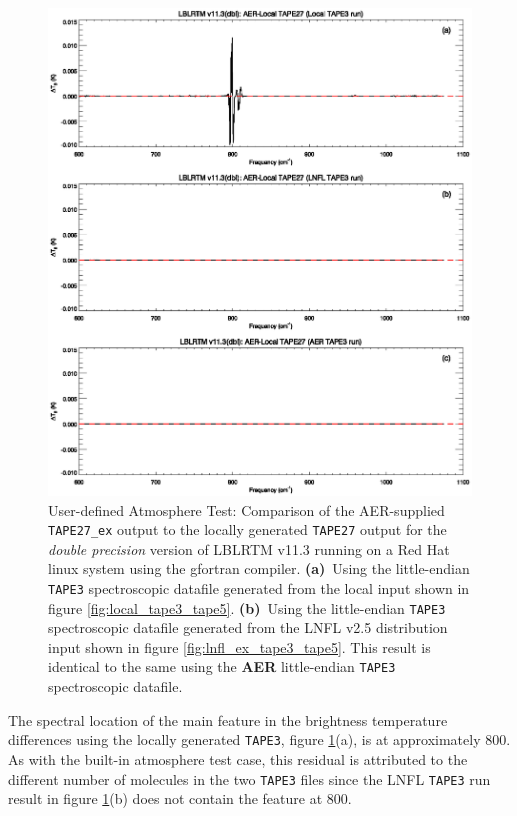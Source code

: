 \begin{figure}[htp]
  \includegraphics[bb=82 313 534 472,clip,scale=1.0]{graphics/run_example_user_defined_upwelling/gfortran/dbl.eps}
  \caption{User-defined Atmosphere Test: Comparison of the AER-supplied \texttt{TAPE27\_ex} output to the locally generated \texttt{TAPE27} output for the \textsl{double precision} version of LBLRTM v11.3 running on a Red Hat linux system using the gfortran compiler. \mbox{\textbf{(a)} Using} the little-endian \texttt{TAPE3} spectroscopic datafile generated from the local input shown in figure \ref{fig:local_tape3_tape5}. \mbox{\textbf{(b)} Using} the little-endian \texttt{TAPE3} spectroscopic datafile generated from the LNFL v2.5 distribution input shown in figure \ref{fig:lnfl_ex_tape3_tape5}. This result is identical to the same using the \textbf{AER} little-endian \texttt{TAPE3} spectroscopic datafile.}
  \label{fig:run_example_user_defined_upwelling-dbl_gfortran}
\end{figure}

The spectral location of the main feature in the brightness temperature differences using the locally generated \texttt{TAPE3}, figure \ref{fig:run_example_user_defined_upwelling-dbl_gfortran}(a), is at approximately 800\invcm{}. As with the built-in atmosphere test case, this residual is attributed to the different number of molecules in the two \texttt{TAPE3} files since the LNFL \texttt{TAPE3} run result in figure \ref{fig:run_example_user_defined_upwelling-dbl_gfortran}(b) does not contain the feature at 800\invcm.

